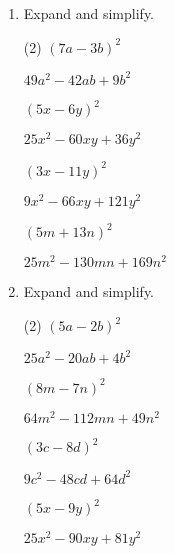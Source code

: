 \begin{enumerate} [leftmargin=0cm]
\item Expand and simplify.
\begin{tasks}[label=(\alph*), after-item-skip=2pt,after-skip=3pt, label-width=4ex](2)
    \task  $ (7a- 3b)^2  $    \\  \begin{envAnswer} $ 49a^2 -  42ab +   9b^2      $ \end{envAnswer}
    \task  $ (5x- 6y)^2  $    \\  \begin{envAnswer} $ 25x^2 -  60xy +  36y^2      $ \end{envAnswer}
    \task  $ (3x-11y)^2  $    \\  \begin{envAnswer} $  9x^2 -  66xy + 121y^2      $ \end{envAnswer}
    \task  $ (5m+13n)^2  $    \\  \begin{envAnswer} $ 25m^2 - 130mn + 169n^2      $ \end{envAnswer}
\end{tasks}


\item Expand and simplify.
\begin{tasks}[label=(\alph*), after-item-skip=2pt,after-skip=3pt, label-width=4ex](2)
    \task  $ (5a- 2b)^2  $    \\  \begin{envAnswer} $ 25a^2 -  20ab +   4b^2      $ \end{envAnswer}
    \task  $ (8m- 7n)^2  $    \\  \begin{envAnswer} $ 64m^2 - 112mn +  49n^2      $ \end{envAnswer}
    \task  $ (3c- 8d)^2  $    \\  \begin{envAnswer} $  9c^2 -  48cd +  64d^2      $ \end{envAnswer}
    \task  $ (5x- 9y)^2  $    \\  \begin{envAnswer} $ 25x^2 -  90xy +  81y^2      $ \end{envAnswer}
\end{tasks}





\end{enumerate}
